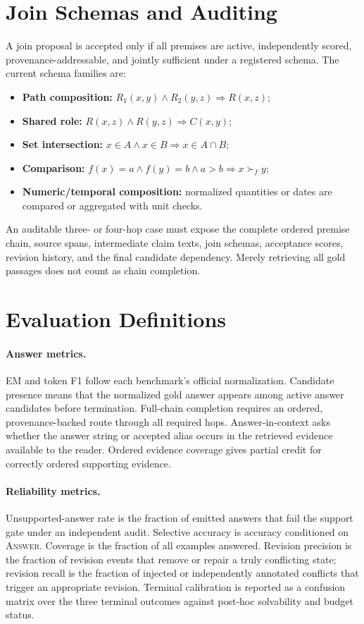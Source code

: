 \section{Join Schemas and Auditing}
\label{app:joins}

A join proposal is accepted only if all premises are active, independently scored, provenance-addressable, and jointly sufficient under a registered schema. The current schema families are:
\begin{itemize}[leftmargin=*]
  \item \textbf{Path composition:} $R_1(x,y)\land R_2(y,z)\Rightarrow R(x,z)$;
  \item \textbf{Shared role:} $R(x,z)\land R(y,z)\Rightarrow C(x,y)$;
  \item \textbf{Set intersection:} $x\in A\land x\in B\Rightarrow x\in A\cap B$;
  \item \textbf{Comparison:} $f(x)=a\land f(y)=b\land a>b\Rightarrow x\succ_f y$;
  \item \textbf{Numeric/temporal composition:} normalized quantities or dates are compared or aggregated with unit checks.
\end{itemize}

An auditable three- or four-hop case must expose the complete ordered premise chain, source spans, intermediate claim texts, join schemas, acceptance scores, revision history, and the final candidate dependency. Merely retrieving all gold passages does not count as chain completion.

\section{Evaluation Definitions}
\label{app:metrics}

\paragraph{Answer metrics.}
EM and token F1 follow each benchmark's official normalization. Candidate presence means that the normalized gold answer appears among active answer candidates before termination. Full-chain completion requires an ordered, provenance-backed route through all required hops. Answer-in-context asks whether the answer string or accepted alias occurs in the retrieved evidence available to the reader. Ordered evidence coverage gives partial credit for correctly ordered supporting evidence.

\paragraph{Reliability metrics.}
Unsupported-answer rate is the fraction of emitted answers that fail the support gate under an independent audit. Selective accuracy is accuracy conditioned on \textsc{Answer}. Coverage is the fraction of all examples answered. Revision precision is the fraction of revision events that remove or repair a truly conflicting state; revision recall is the fraction of injected or independently annotated conflicts that trigger an appropriate revision. Terminal calibration is reported as a confusion matrix over the three terminal outcomes against post-hoc solvability and budget status.

